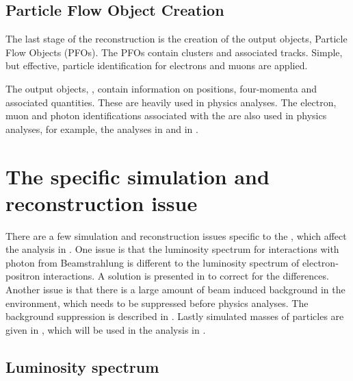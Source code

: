 \subsection{Particle Flow Object Creation}
\label{sec:pandoraPFOcreation}

The last stage of the reconstruction is the creation of the output objects, Particle Flow Objects (PFOs). The PFOs contain clusters and associated tracks. Simple, but effective, particle identification for electrons and muons are applied.

The output objects, \PFOs, contain information on positions, four-momenta and associated quantities. These \PFOs are heavily used  in physics analyses. The electron, muon and photon identifications associated with the \PFOs are  also used in physics analyses, for example, the analyses in  and in .


\section{The \CLIC specific simulation and reconstruction issue}

There are a few  simulation and reconstruction issues specific to the \CLIC, which affect the analysis in . One issue is that the luminosity spectrum for  interactions with photon from Beamstrahlung is different to the luminosity spectrum of electron-positron interactions. A solution is presented in  to correct for the differences. Another issue is that there is a large amount of beam induced background in the \CLIC environment, which needs to be suppressed before physics analyses. The background suppression is described in . Lastly simulated masses of particles are given in , which will be used in the analysis in .





\subsection{Luminosity spectrum}
\label{sec:pandoraCLUClumi}

